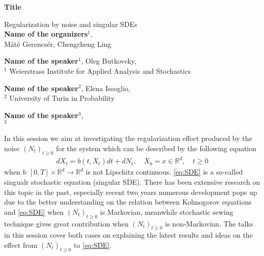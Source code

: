 \documentclass{article}
\begin{document}
\thispagestyle{empty}
\newcommand{\titulo}[1]{\Large{\bf #1}}
\newcommand{\nome}[1]{\Large{#1}}
\newcommand{\instituicao}[1]{\Large{#1}}
\newcommand{\resumo}[1]{\large{\bf}{#1}}
\newcommand{\ack}[1]{\large{\bf}{#1}}
\newcommand{\funding}[1]{\large{\bf}{#1}}


\noindent
\Large{\bf Title}

\bigskip

Regularization by noise and singular SDEs\\

\noindent
\Large{{\bf  Name of the organizers}}$^{1}$,
\\
\noindent
 M\'at\'e Gerencs\'er, Chengcheng Ling
\bigskip

\noindent
\Large{{\bf  Name of the speaker}}$^{1}$, Oleg Butkovsky, 
\\
\noindent
\noindent
{\footnotesize $^1$
Weierstrass Institute for Applied Analysis and Stochastics\\}

 
\noindent
\Large{{\bf  Name of the speaker}}$^{2}$, Elena Issoglio,   
\\
\noindent
\noindent
{\footnotesize $^2$
University of Turin in Probability\\}

\noindent
\Large{{\bf  Name of the speaker}}$^{3}$,
\\
\noindent
\noindent
{\footnotesize $^3$
 \\}

\bigskip

\noindent
\resumo{\newline
In this session we aim at investigating the regularization effect produced by the noise $(N_t)_{t\geq0}$ for the system which can be described by the following equation 
\begin{align}\label{eq:SDE}
  dX_t=b(t,X_t)dt+dN_t,\quad X_0=x\in\mathbb{R}^d,\quad t\geq 0
\end{align}  
when $b:[0,T]\times\mathbb{R}^d\rightarrow\mathbb{R}^d$ is not Lipschitz continuous.  \eqref{eq:SDE} is a so-called singualr stochastic equation (singular SDE).  There has been extensive research on this topic in the past, especially recent two years numerous development pops up due to the better understanding on the relation between Kolmogorov equations  and \eqref{eq:SDE} when $(N_t)_{t\geq0}$ is Markovian, meanwhile stochastic sewing technique gives great contribution when $(N_t)_{t\geq0}$ is non-Markovian.  The talks in this session cover both cases on explaining the latest results and ideas on the effect from $(N_t)_{t\geq0}$ to \eqref{eq:SDE}.
}
\end{document}
